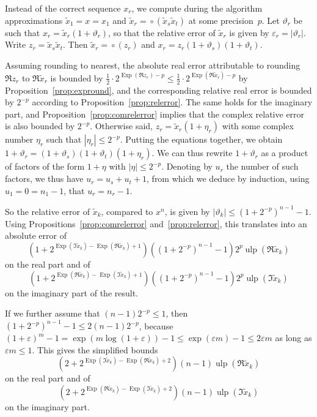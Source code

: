 \documentclass [11pt]{article}
\newcommand {\corr}[1]{{#1}}
\newcommand {\appro}[1]{\widetilde {#1}}
\newcommand {\Ulp}{{\operatorname {ulp}}}
\DeclareMathOperator{\Exp}{\operatorname {Exp}}
\newcommand {\round}{\operatorname {\circ}}
\renewcommand {\epsilon}{\varepsilon}
\renewcommand {\theta}{\vartheta}
\renewcommand {\leq}{\leqslant}
\begin{document}
Instead of the correct sequence $\corr x_r$, we compute during the algorithm
approximations $\appro x_1 = x = \corr x_1$ and
$\appro x_r = \round (\appro x_s \appro x_t)$
at some precision~$p$.
Let $\theta_r$ be such that $\corr x_r = \appro x_r (1 + \theta_r)$, so that
the relative error of $\appro x_r$ is given by $\epsilon_r = |\theta_r|$.
Write $z_r = \appro x_s \appro x_t$.
Then $\appro x_r = \round (z_r)$ and
$\corr x_r = z_r (1 + \theta_s)(1 + \theta_t)$.

Assuming rounding to nearest, the absolute real error attributable to
rounding $\Re z_r$ to $\Re \appro x_r$ is bounded by
$\frac {1}{2} \cdot 2^{\Exp (\Re z_r) - p}
\leq \frac {1}{2} \cdot 2^{\Exp (\Re \appro x_r) - p}$
by Proposition~\ref {prop:expround}, and the corresponding
relative real error is bounded by $2^{-p}$ according to
Proposition~\ref {prop:relerror}. The same holds for the imaginary part,
and Proposition~\ref {prop:comrelerror} implies that the complex
relative error is also bounded by $2^{-p}$. Otherwise said,
$z_r = \appro x_r (1 + \eta_r)$ with
some complex number $\eta_r$ such that $|\eta_r| \leq 2^{-p}$.
Putting the equations together, we obtain
$1 + \theta_r = (1 + \theta_s)(1 + \theta_t)(1 + \eta_r)$.
We can thus rewrite $1 + \theta_r$ as a product of factors of the
form $1 + \eta$ with $|\eta| \leq 2^{-p}$. Denoting by $u_r$ the
number of such factors, we thus have $u_r = u_s + u_t + 1$, from which
we deduce by induction, using $u_1 = 0 = n_1 - 1$,
that $u_r = n_r - 1$.

So the relative error of $\appro x_k$, compared to $x^n$, is given by
$|\theta_k| \leq (1 + 2^{-p})^{n-1} - 1$.
Using Propositions~\ref {prop:comrelerror}
and~\ref {prop:relerror}, this translates into an absolute error of
\[
\left( 1 + 2^{\Exp (\Im \appro x_k) - \Exp (\Re \appro x_k) + 1} \right)
\left( (1 + 2^{-p})^{n-1} - 1 \right)
2^p \Ulp (\Re \appro x_k)
\]
on the real part and of
\[
\left( 1 + 2^{\Exp (\Re \appro x_k) - \Exp (\Im \appro x_k) + 1} \right)
\left( (1 + 2^{-p})^{n-1} - 1 \right)
2^p \Ulp (\Im \appro x_k)
\]
on the imaginary part of the result.

If we further assume that $(n-1) 2^{-p} \leq 1$, then
$(1 + 2^{-p})^{n-1} - 1 \leq 2 (n - 1) 2^{-p}$,
because $(1+\varepsilon)^m-1 = \exp(m \log(1+\varepsilon)) - 1
\leq \exp(\varepsilon m) - 1 \leq 2 \varepsilon m$ as long as
$\varepsilon m \leq 1$. This gives the simplified bounds
\begin{equation} \label{eq:powui_re}
\left( 2 + 2^{\Exp (\Im \appro x_k) - \Exp (\Re \appro x_k) + 2} \right)
(n-1) \Ulp (\Re \appro x_k)
\end{equation}
on the real part and of
\begin{equation} \label{eq:powui_im}
\left( 2 + 2^{\Exp (\Re \appro x_k) - \Exp (\Im \appro x_k) + 2} \right)
(n-1) \Ulp (\Im \appro x_k)
\end{equation}
on the imaginary part.
\end{document}
